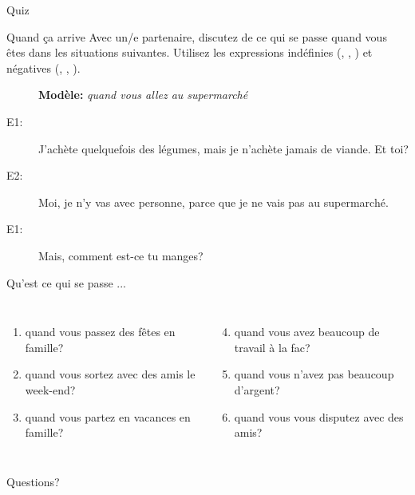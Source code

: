 \documentclass{beamer}
\begin{document}
  \begin{frame}{}
    \begin{center}
      \Large Quiz
    \end{center}
  \end{frame}

  \begin{frame}{Quand ça arrive}
    \scriptsize
    Avec un/e partenaire, discutez de ce qui se passe  quand vous êtes dans les situations suivantes.
    Utilisez les expressions indéfinies (, , ) et négatives (, , ).
    \begin{description}
      \item[] \textbf{Modèle:} \emph{quand vous allez au supermarché}
      \item[E1:] J'achète \alert{quelquefois} des légumes, mais je n'achète \alert{jamais} de viande. Et toi?
      \item[E2:] Moi, je n'y vas avec \alert{personne}, parce que je ne vais pas au supermarché.
      \item[E1:] Mais, comment est-ce tu manges?
    \end{description}
    \vspace{0.3cm}
    Qu'est ce qui se passe ...
    \begin{columns}[t]
        \begin{enumerate}
          \item quand vous passez des fêtes en famille?
          \item quand vous sortez avec des amis le week-end?
          \item quand vous partez en vacances en famille?
        \end{enumerate}
        \begin{enumerate}
          \setcounter{enumi}{3}
          \item quand vous avez beaucoup de travail à la fac?
          \item quand vous n'avez pas beaucoup d'argent?
          \item quand vous vous disputez avec des amis?
        \end{enumerate}
    \end{columns}
  \end{frame}

  \begin{frame}{}
    \begin{center}
      \Large Questions?
    \end{center}
  \end{frame}
\end{document}
